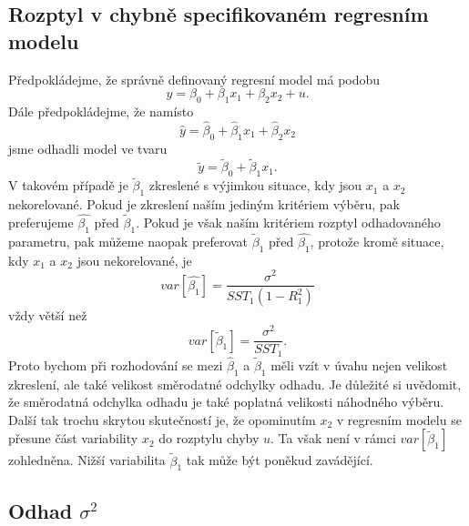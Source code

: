 \subsection{Rozptyl v chybně specifikovaném regresním modelu}

Předpokládejme, že správně definovaný regresní model má podobu
\begin{equation}
y = \beta_0 + \beta_1 x_1 + \beta_2 x_2 + u.
\end{equation}
Dále předpokládejme, že namísto
\begin{equation}
\hat{y} = \hat{\beta}_0 + \hat{\beta}_1 x_1 + \hat{\beta}_2 x_2
\end{equation}
jsme odhadli model ve tvaru
\begin{equation}
\tilde{y} = \tilde{\beta}_0 + \tilde{\beta}_1 x_1.
\end{equation}
V takovém případě je $\tilde{\beta}_1$ zkreslené s výjimkou situace, kdy jsou $x_1$ a $x_2$ nekorelované. Pokud je zkreslení naším jediným 
kritériem výběru, pak preferujeme $\hat{\beta_1}$ před $\tilde{\beta}_1$. Pokud je však naším kritériem rozptyl odhadovaného parametru, pak 
můžeme naopak preferovat $\tilde{\beta}_1$ před $\hat{\beta_1}$, protože kromě situace, kdy $x_1$ a $x_2$ jsou nekorelované, je
\begin{equation}
var[\hat{\beta_1}] = \frac{\sigma^2}{SST_1(1 - R^2_1)}
\end{equation}
vždy větší než
\begin{equation}
var[\tilde{\beta}_1] = \frac{\sigma^2}{SST_1}.
\end{equation}
Proto bychom při rozhodování se mezi $\hat{\beta}_1$ a $\tilde{\beta}_1$ měli vzít v úvahu nejen velikost zkreslení, ale také velikost 
směrodatné odchylky odhadu. Je důležité si uvědomit, že směrodatná odchylka odhadu je také poplatná velikosti náhodného výběru. 
Další tak trochu skrytou skutečností je, že opominutím $x_2$ v regresním modelu se přesune část variability $x_2$ do 
rozptylu chyby $u$. Ta však není v rámci $var[\tilde{\beta}_1]$ zohledněna. Nižší variabilita $\tilde{\beta}_1$ tak může být poněkud zavádějící.

\subsection{Odhad $\sigma^2$}

